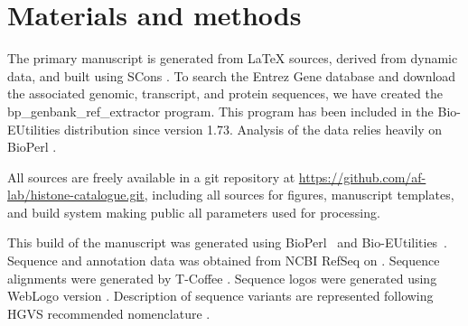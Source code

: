 \section{Materials and methods}

  The primary manuscript is generated from \LaTeX{} sources, derived
  from dynamic data, and built using SCons \citep{SCons2005}. To
  search the Entrez Gene database and download the associated genomic,
  transcript, and protein sequences, we have created the
  bp\_genbank\_ref\_extractor program. This program has been included
  in the Bio-EUtilities distribution since version 1.73. Analysis of
  the data relies heavily on BioPerl \citep{bioperl}.

  All sources are freely available in a git repository at
  \url{https://github.com/af-lab/histone-catalogue.git}, including all
  sources for figures, manuscript templates, and build system making public
  all parameters used for processing.

  This build of the manuscript was generated using BioPerl~\BioPerlVersion{}
  and Bio-EUtilities~\BioEUtilitiesVersion{}.
  Sequence and annotation data was obtained from NCBI RefSeq \citep{OLearyRefseq2016}
  on \printdate{\SequencesDate{}}.
  Sequence alignments were generated by T-Coffee \TCoffeVersion{} \citep{tcoffee2000}.
  Sequence logos were generated using WebLogo version \WebLogoVersion{} \citep{weblogo}.
  Description of sequence variants are represented following HGVS
  recommended nomenclature \citep{mutnomenclature2016}.
